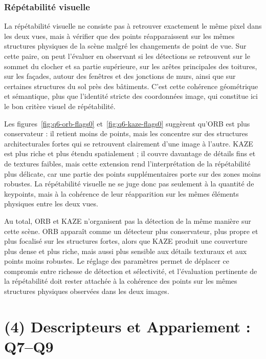 \documentclass[11pt,a4paper]{article}
\begin{document}
\subsubsection{Répétabilité visuelle}
La répétabilité visuelle ne consiste pas à retrouver exactement le même pixel dans les deux vues, mais à vérifier que des points réapparaissent sur les mêmes structures physiques de la scène malgré les changements de point de vue. Sur cette paire, on peut l'évaluer en observant si les détections se retrouvent sur le sommet du clocher et sa partie supérieure, sur les arêtes principales des toitures, sur les façades, autour des fenêtres et des jonctions de murs, ainsi que sur certaines structures du sol près des bâtiments. C'est cette cohérence géométrique et sémantique, plus que l'identité stricte des coordonnées image, qui constitue ici le bon critère visuel de répétabilité.

Les figures~\ref{fig:q6-orb-flags0} et~\ref{fig:q6-kaze-flags0} suggèrent qu'ORB est plus conservateur : il retient moins de points, mais les concentre sur des structures architecturales fortes qui se retrouvent clairement d'une image à l'autre. KAZE est plus riche et plus étendu spatialement ; il couvre davantage de détails fins et de textures faibles, mais cette extension rend l'interprétation de la répétabilité plus délicate, car une partie des points supplémentaires porte sur des zones moins robustes. La répétabilité visuelle ne se juge donc pas seulement à la quantité de keypoints, mais à la cohérence de leur réapparition sur les mêmes éléments physiques entre les deux vues.

Au total, ORB et KAZE n'organisent pas la détection de la même manière sur cette scène. ORB apparaît comme un détecteur plus conservateur, plus propre et plus focalisé sur les structures fortes, alors que KAZE produit une couverture plus dense et plus riche, mais aussi plus sensible aux détails texturaux et aux points moins robustes. Le réglage des paramètres permet de déplacer ce compromis entre richesse de détection et sélectivité, et l'évaluation pertinente de la répétabilité doit rester attachée à la cohérence des points sur les mêmes structures physiques observées dans les deux images.

\section{(4) Descripteurs et Appariement : Q7--Q9}
\end{document}
